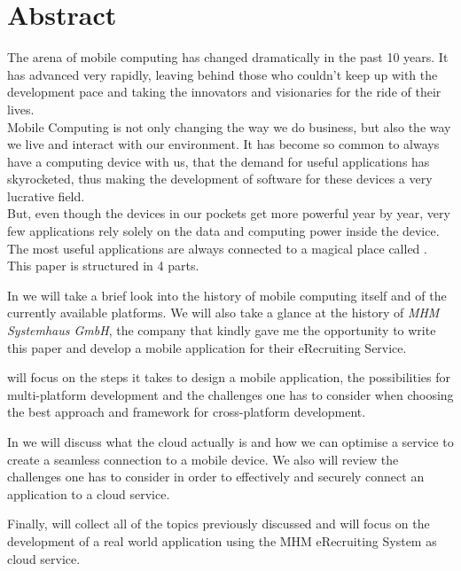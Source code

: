 \begingroup
\let\clearpage\relax
\let\cleardoublepage\relax
\let\cleardoublepage\relax
\vfill
{}
\chapter*{Abstract}
The arena of mobile computing has changed dramatically in the past 10 years. It has advanced very rapidly, leaving behind those who couldn't keep up with the development pace and taking the innovators and visionaries for the ride of their lives.\\
\newline
Mobile Computing is not only changing the way we do business, but also the way we live and interact with our environment. It has become so common to always have a computing device with us, that the demand for useful applications has skyrocketed, thus making the development of software for these devices a very lucrative field.\\
\newline
But,  even though the devices in our pockets get more powerful year by year, very few applications rely solely on the data and computing power inside the device. The most useful applications are always connected to a magical place called .\\
\newline
This paper is structured in 4 parts. 


In  we will take a brief look into the history of mobile computing itself and of the currently available platforms. We will also take a glance at the history of \emph{MHM Systemhaus GmbH}, the company that kindly gave me the opportunity to write this paper and develop a mobile application for their eRecruiting Service.   


 will focus on the steps it takes to design a mobile application, the possibilities for multi-platform development and the challenges one has to consider when choosing the best approach and framework for cross-platform development.

In  we will discuss what the cloud actually is and how we can optimise a service to create a seamless connection to a mobile device. We also will review the challenges one has to consider in order to effectively and securely connect an application to a cloud service.

Finally,  will collect all of the topics previously discussed and will focus on the development of a real world application using the MHM eRecruiting System as cloud service.       


\vfill


\endgroup			

\vfill